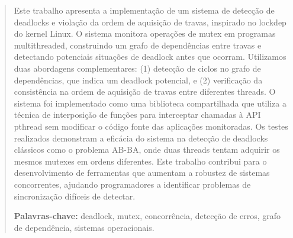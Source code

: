 \begin{abstract}
Este trabalho apresenta a implementação de um sistema de detecção de deadlocks e violação da ordem de aquisição de travas, inspirado no lockdep do kernel Linux. O sistema monitora operações de mutex em programas multithreaded, construindo um grafo de dependências entre travas e detectando potenciais situações de deadlock antes que ocorram. Utilizamos duas abordagens complementares: (1) detecção de ciclos no grafo de dependências, que indica um deadlock potencial, e (2) verificação da consistência na ordem de aquisição de travas entre diferentes threads. O sistema foi implementado como uma biblioteca compartilhada que utiliza a técnica de interposição de funções para interceptar chamadas à API pthread sem modificar o código fonte das aplicações monitoradas. Os testes realizados demonstram a eficácia do sistema na detecção de deadlocks clássicos como o problema AB-BA, onde duas threads tentam adquirir os mesmos mutexes em ordens diferentes. Este trabalho contribui para o desenvolvimento de ferramentas que aumentam a robustez de sistemas concorrentes, ajudando programadores a identificar problemas de sincronização difíceis de detectar.

\vspace{0.5cm}

\noindent\textbf{Palavras-chave:} deadlock, mutex, concorrência, detecção de erros, grafo de dependência, sistemas operacionais.
\end{abstract}
